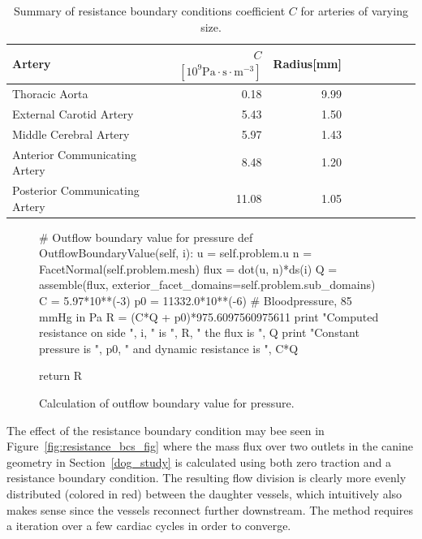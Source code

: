 \begin{table}
  \begin{center}
    \begin{tabular}{l*{7}{r}r}
      Artery & $C$ $ [10^9 \mathrm{Pa} \cdot \mathrm{s}  \cdot \mathrm{m}^{-3}]$ & Radius[mm]\\
      \hline
      Thoracic Aorta			&  0.18 &  	9.99\\
      External Carotid Artery  	& 5.43   &	1.50\\
      Middle Cerebral Artery  	& 5.97   &	1.43\\
      Anterior Communicating Artery  	& 8.48   &	1.20\\
      Posterior Communicating Artery  & 11.08   &	1.05\\
    \end{tabular}
  \end{center}
  \caption{Summary of resistance boundary conditions coefficient $C$
    for arteries of varying size.}
  \label{resistance_coeff}
\end{table}

\begin{figure}
  \begin{center}
    \begin{python}
# Outflow boundary value for pressure
def OutflowBoundaryValue(self, i):
    u = self.problem.u
    n = FacetNormal(self.problem.mesh)
    flux = dot(u, n)*ds(i)
    Q = assemble(flux, exterior_facet_domains=self.problem.sub_domains)
    C = 5.97*10**(-3)
    p0 = 11332.0*10**(-6) # Bloodpressure, 85 mmHg in Pa
    R = (C*Q + p0)*975.6097560975611
    print "Computed resistance on side ", i, " is ", R, " the flux is ", Q
    print "Constant pressure is ", p0, " and dynamic resistance is ", C*Q

    return R

    \end{python}
    \caption{Calculation of outflow boundary value for pressure.}
    \label{fig:resistance_code}
  \end{center}
\end{figure}

The effect of the resistance boundary condition may bee seen in
Figure~\ref{fig:resistance_bcs_fig} where the mass flux over two
outlets in the canine geometry in Section~\ref{dog_study} is
calculated using both zero traction and a resistance boundary
condition. The resulting flow division is clearly more evenly
distributed (colored in red) between the daughter vessels, which
intuitively also makes sense since the vessels reconnect further
downstream. The method requires a iteration over a few cardiac cycles
in order to converge.

